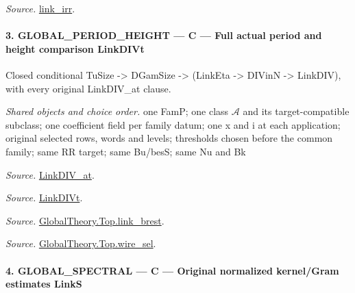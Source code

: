 \emph{Source.} \href{https://github.com/CocoSgt/riemann-hypothesis-lean/blob/7cbf7a0c32fca1badf05931879a37c3f8a2b03b4/src/Development/AbelianVarietyTheory/Proofs/GlobalInterpolation/LinkIRROfJoinEx.lean#L143-L166}{link\_\allowbreak irr}.



\paragraph{3. GLOBAL\_\allowbreak PERIOD\_\allowbreak HEIGHT — C — Full actual period and height comparison LinkDIVt}

Closed conditional TuSize -> DGamSize -> (LinkEta -> DIVinN -> LinkDIV), with every original LinkDIV\_\allowbreak at clause.

\emph{Shared objects and choice order.} one FamP; one class $\mathcal A$ and its target-compatible subclass; one coefficient field per family datum; one x and i at each application; original selected rows, words and levels; thresholds chosen before the common family; same RR target; same Bu/besS; same Nu and Bk

\emph{Source.} \href{https://github.com/CocoSgt/riemann-hypothesis-lean/blob/7cbf7a0c32fca1badf05931879a37c3f8a2b03b4/src/Formalism/SharpRestriction/GlobalTheoremInputs.lean#L77-L90}{LinkDIV\_\allowbreak at}.

\emph{Source.} \href{https://github.com/CocoSgt/riemann-hypothesis-lean/blob/7cbf7a0c32fca1badf05931879a37c3f8a2b03b4/src/Formalism/SharpRestriction/GlobalTheoremInputs.lean#L94-L96}{LinkDIVt}.

\emph{Source.} \href{https://github.com/CocoSgt/riemann-hypothesis-lean/blob/7cbf7a0c32fca1badf05931879a37c3f8a2b03b4/src/Development/AbelianVarietyTheory/Proofs/GlobalInterpolation/LinkBrest.lean#L7-L25}{GlobalTheory.Top.link\_\allowbreak brest}.

\emph{Source.} \href{https://github.com/CocoSgt/riemann-hypothesis-lean/blob/7cbf7a0c32fca1badf05931879a37c3f8a2b03b4/src/Development/AbelianVarietyTheory/Proofs/GlobalInterpolation/WireSel.lean#L11-L41}{GlobalTheory.Top.wire\_\allowbreak sel}.



\paragraph{4. GLOBAL\_\allowbreak SPECTRAL — C — Original normalized kernel/Gram estimates LinkS}

